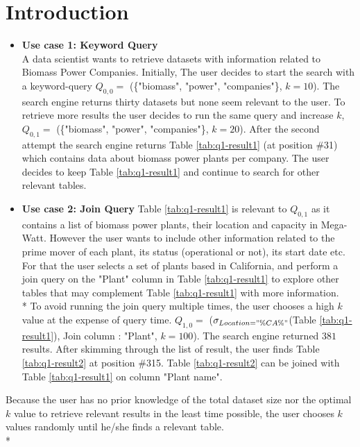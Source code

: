 \section{Introduction}
\label{sec:introduction}

\begin{itemize}
	\item \textbf{Use case 1: Keyword Query}\\
	 A data scientist wants to retrieve datasets with information related to Biomass Power Companies. Initially,  The user decides to start the search with a keyword-query $Q_{0,0} = $  (\{"biomass", "power", "companies"\}, $k = 10$). The search engine returns thirty datasets but none seem relevant to the user.
	 To retrieve more results the user decides to run the same query and increase $k$, $Q_{0,1} = $  (\{"biomass", "power", "companies"\}, $k = 20$). After the second attempt the search engine returns Table \ref{tab:q1-result1} (at position \#31) which contains data about biomass power plants per company. The user decides to keep Table \ref{tab:q1-result1} and continue to search for other relevant tables.\\
	
	\item \textbf{Use case 2: Join Query}
	Table \ref{tab:q1-result1} is relevant to $Q_{0,1}$ as it contains a list of biomass power plants, their location and capacity in Mega-Watt. However the user wants to include other information related to the prime mover of each plant, its status (operational or not), its start date etc. For that the user selects a set of plants based in California,  and  perform a join query on the "Plant" column in Table \ref{tab:q1-result1} to explore other tables that may complement  Table \ref{tab:q1-result1} with more information. \\*
	To avoid running the join query multiple times, the user chooses a high $k$ value at the expense of query time.
	$Q_{1,0} =$ ($\sigma_{Location = "\%CA\%"}$(Table \ref{tab:q1-result1}), Join column : "Plant", $k = 100$). The search engine returned $381$ results. After skimming through the list of result, the user finds Table \ref{tab:q1-result2} at position \#315. Table \ref{tab:q1-result2} can be joined with Table \ref{tab:q1-result1} on column "Plant name". \\
	
\end{itemize}
Because the user has no prior knowledge of the total dataset size nor the optimal $k$ value to retrieve relevant results in the least time possible, the user chooses $k$ values randomly until he/she finds a relevant table.\\*
